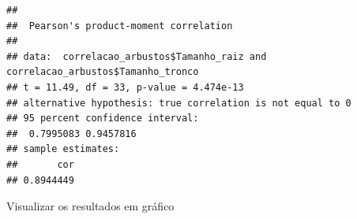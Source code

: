 \documentclass[
]{book}
\newenvironment{Shaded}{\begin{snugshade}}{\end{snugshade}}
\newcommand{\CommentTok}[1]{\textcolor[rgb]{0.56,0.35,0.01}{\textit{#1}}}
\newcommand{\DataTypeTok}[1]{\textcolor[rgb]{0.13,0.29,0.53}{#1}}
\newcommand{\KeywordTok}[1]{\textcolor[rgb]{0.13,0.29,0.53}{\textbf{#1}}}
\newcommand{\NormalTok}[1]{#1}
\newcommand{\OperatorTok}[1]{\textcolor[rgb]{0.81,0.36,0.00}{\textbf{#1}}}
\newcommand{\StringTok}[1]{\textcolor[rgb]{0.31,0.60,0.02}{#1}}
\begin{document}
\begin{Shaded}
\end{Shaded}

\begin{verbatim}
## 
## 	Pearson's product-moment correlation
## 
## data:  correlacao_arbustos$Tamanho_raiz and correlacao_arbustos$Tamanho_tronco
## t = 11.49, df = 33, p-value = 4.474e-13
## alternative hypothesis: true correlation is not equal to 0
## 95 percent confidence interval:
##  0.7995083 0.9457816
## sample estimates:
##       cor 
## 0.8944449
\end{verbatim}

Visualizar os resultados em gráfico
\end{document}
